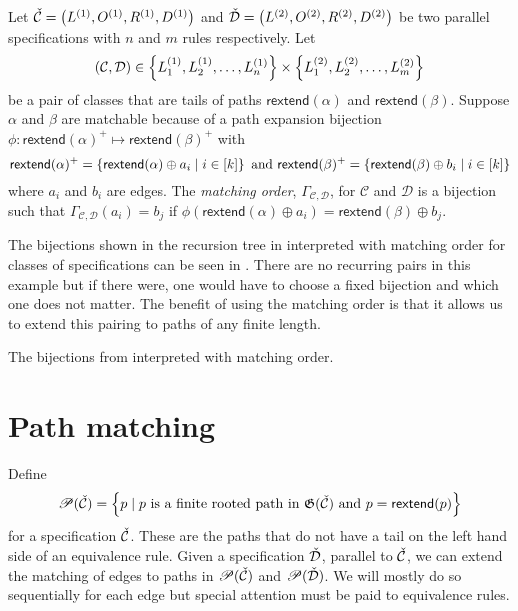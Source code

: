 \begin{definition}
Let $\check{\mathcal{C}} = \left(L^{(1)}, O^{(1)}, R^{(1)}, D^{(1)}\right)$ and $\check{\mathcal{D}} = \left(L^{(2)}, O^{(2)}, R^{(2)}, D^{(2)}\right)$ be two parallel specifications with $n$ and $m$ rules respectively. Let
\[
    \left(\mathcal{C},\mathcal{D}\right) \in \left\{L^{(1)}_1,L^{(1)}_2,\dotsc,L^{(1)}_n\right\} \times \left\{L^{(2)}_1, L^{(2)}_2, \dotsc, L^{(2)}_m\right\}
\]
be a pair of classes that are tails of paths $\textsf{rextend}(\alpha)$ and $\textsf{rextend}(\beta)$. Suppose $\alpha$ and $\beta$ are matchable because of a path expansion bijection $\phi: \textsf{rextend}(\alpha)^+ \mapsto \textsf{rextend}(\beta)^+$ with
\[
    \textsf{rextend}(\alpha)^+ = \left\{\textsf{rextend}(\alpha) \oplus a_i \mid i \in [k]\right\} \text{ and } \textsf{rextend}(\beta)^+ = \left\{\textsf{rextend}(\beta) \oplus b_i \mid i \in [k]\right\}
\]
where $a_i$ and $b_i$ are edges. The \emph{matching order}, $\Gamma_{\mathcal{C},\mathcal{D}}$, for $\mathcal{C}$ and $\mathcal{D}$ is a bijection such that $\Gamma_{\mathcal{C},\mathcal{D}}(a_i) = b_j$ if $\phi(\textsf{rextend}(\alpha) \oplus a_i) = \textsf{rextend}(\beta) \oplus b_j$.
\end{definition}

 The bijections shown in the recursion tree in  interpreted with matching order for classes of specifications can be seen in . There are no recurring pairs in this example but if there were, one would have to choose a fixed bijection and which one does not matter. The benefit of using the matching order is that it allows us to extend this pairing to paths of any finite length.

\begin{table}[ht!]
    \centering
    
    \caption{The bijections from  interpreted with matching order.}
    \label{tab:corrmatch}
\end{table}

\section{Path matching}
Define
\[
    \mathscr{P}(\check{\mathcal{C}}) = \left\{p \mid p \text{ is a finite rooted path in } \mathfrak{G}(\check{\mathcal{C}}) \text{ and }p = \textsf{rextend}(p)\right\}
\]
for a specification $\check{\mathcal{C}}$. These are the paths that do not have a tail on the left hand side of an equivalence rule. Given a specification $\check{\mathcal{D}}$, parallel to $\check{\mathcal{C}}$, we can extend the matching of edges to paths in $\mathscr{P}(\check{\mathcal{C}})$ and $\mathscr{P}(\check{\mathcal{D}})$. We will mostly do so sequentially for each edge but special attention must be paid to equivalence rules.

